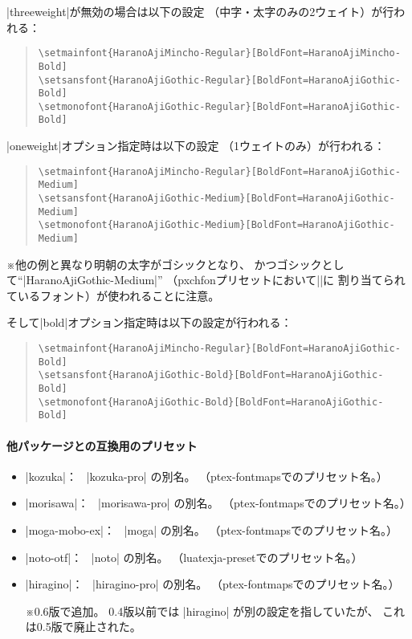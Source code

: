 \documentclass[xelatex,ja=standard,jafont=ipaex,
  a4paper]{bxjsarticle}
\newcommand{\Pkg}[1]{\textsf{#1}}
\newcommand{\Note}{\par\noindent ※}
\newcommand{\Means}{：\ }
\begin{document}
|threeweight|\>が無効の場合は以下の設定
（中字・太字のみの2ウェイト）が行われる：
\begin{quote}\small\begin{verbatim}
\setmainfont{HaranoAjiMincho-Regular}[BoldFont=HaranoAjiMincho-Bold]
\setsansfont{HaranoAjiGothic-Regular}[BoldFont=HaranoAjiGothic-Bold]
\setmonofont{HaranoAjiGothic-Regular}[BoldFont=HaranoAjiGothic-Bold]
\end{verbatim}\end{quote}

|oneweight|\>オプション指定時は以下の設定
（1ウェイトのみ）が行われる：
\begin{quote}\small\begin{verbatim}
\setmainfont{HaranoAjiMincho-Regular}[BoldFont=HaranoAjiGothic-Medium]
\setsansfont{HaranoAjiGothic-Medium}[BoldFont=HaranoAjiGothic-Medium]
\setmonofont{HaranoAjiGothic-Medium}[BoldFont=HaranoAjiGothic-Medium]
\end{verbatim}\end{quote}
\Note 他の例と異なり明朝の太字がゴシックとなり、
かつゴシックとして“|HaranoAjiGothic-Medium|”%
（\Pkg{pxchfon}プリセットにおいて\>|\setgothicfont|\>に
割り当てられているフォント）が使われることに注意。

そして\>|bold|\>オプション指定時は以下の設定が行われる：
\begin{quote}\small\begin{verbatim}
\setmainfont{HaranoAjiMincho-Regular}[BoldFont=HaranoAjiGothic-Bold]
\setsansfont{HaranoAjiGothic-Bold}[BoldFont=HaranoAjiGothic-Bold]
\setmonofont{HaranoAjiGothic-Bold}[BoldFont=HaranoAjiGothic-Bold]
\end{verbatim}\end{quote}

\paragraph{他パッケージとの互換用のプリセット}
\mbox{}

\begin{itemize}
\item |kozuka|\Means
  |kozuka-pro| の別名。
  （\Pkg{ptex-fontmaps}でのプリセット名。）
\item |morisawa|\Means
  |morisawa-pro| の別名。
  （\Pkg{ptex-fontmaps}でのプリセット名。）
\item |moga-mobo-ex|\Means
  |moga| の別名。
  （\Pkg{ptex-fontmaps}でのプリセット名。）
\item |noto-otf|\Means
  |noto| の別名。
  （\Pkg{luatexja-preset}でのプリセット名。）
\item |hiragino|\Means
  |hiragino-pro| の別名。
  （\Pkg{ptex-fontmaps}でのプリセット名。）
  \Note 0.6版で追加。
  0.4版以前では |hiragino| が別の設定を指していたが、
  これは0.5版で廃止された。
\end{itemize}
\end{document}
